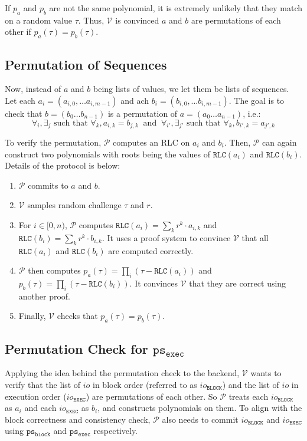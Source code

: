 \documentclass{article}
\renewcommand{\P}{\mathcal{P}}
\newcommand{\V}{\mathcal{V}}
\newcommand{\RLC}{\mathtt{RLC}}
\newcommand{\iob}{io_{\mathtt{BLOCK}}}
\newcommand{\ioe}{io_{\mathtt{EXEC}}}
\newcommand{\psb}{\mathtt{ps_{block}}}
\newcommand{\pse}{\mathtt{ps_{exec}}}
\begin{document}
If $p_a$ and $p_b$ are not the same polynomial, it is extremely unlikely that they match on a random value $\tau$. Thus, $\V$ is convinced $a$ and $b$ are permutations of each other if $p_a(\tau) = p_b(\tau)$.

\subsection{Permutation of Sequences}

Now, instead of $a$ and $b$ being lists of values, we let them be lists of sequences. Let each $a_i = (a_{i, 0}, \dots a_{i, m-1})$ and ach $b_i = (b_{i, 0}, \dots b_{i, m-1})$. The goal is to check that $b = (b_0\dots b_{n-1})$ is a permutation of $a = (a_0\dots a_{n-1})$, i.e.:
$$\forall_i, \exists_j \mbox{ such that } \forall_k, a_{i, k} = b_{j, k} \ \mbox{ and }\ \forall_{i'}, \exists_{j'} \mbox{ such that } \forall_k, b_{i', k} = a_{j', k}$$

To verify the permutation, $\P$ computes an RLC on $a_i$ and $b_i$. Then, $\P$ can again construct two polynomials with roots being the values of $\RLC(a_i)$ and $\RLC(b_i)$. Details of the protocol is below:
\begin{enumerate}
    \item $\P$ commits to $a$ and $b$.
    \item $\V$ samples random challenge $\tau$ and $r$.
    \item For $i\in [0, n)$, $\P$ computes $\RLC(a_i) = \sum_k r^k \cdot a_{i, k}$ and $\RLC(b_i) = \sum_k r^k \cdot b_{i, k}$. It uses a proof system to convince $\V$ that all $\RLC(a_i)$ and $\RLC(b_i)$ are computed correctly.
    \item $\P$ then computes $p_a(\tau) = \prod_i (\tau - \RLC(a_i))$ and $p_b(\tau) = \prod_i (\tau - \RLC(b_i))$. It convinces $\V$ that they are correct using another proof.
    \item Finally, $\V$ checks that $p_a(\tau) = p_b(\tau)$.
\end{enumerate} 

\subsection{Permutation Check for $\pse$}

Applying the idea behind the permutation check to the backend, $\V$ wants to verify that the list of $io$ in block order (referred to as $\iob$) and the list of $io$ in execution order ($\ioe$) are permutations of each other. So $\P$ treats each $\iob$ as $a_i$ and each $\ioe$ as $b_i$, and constructs polynomials on them. To align with the block correctness and consistency check, $\P$ also needs to commit $\iob$ and $\ioe$ using $\psb$ and $\pse$ respectively.
\end{document}
